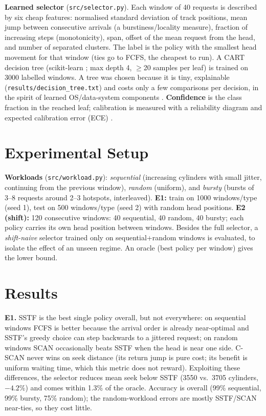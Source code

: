 \documentclass[10pt,a4paper]{article}
\begin{document}
\textbf{Learned selector} (\texttt{src/selector.py}). Each window of 40 requests is described by
six cheap features: normalised standard deviation of track positions, mean jump between
consecutive arrivals (a burstiness/locality measure), fraction of increasing steps
(monotonicity), span, offset of the mean request from the head, and number of separated
clusters. The label is the policy with the smallest head movement for that window (ties go to
FCFS, the cheapest to run). A CART decision tree \cite{breiman1984} (scikit-learn
\cite{sklearn}; max depth 4, $\geq$20 samples per leaf) is trained on 3000 labelled windows. A
tree was chosen because it is tiny, explainable (\texttt{results/decision\_tree.txt}) and costs
only a few comparisons per decision, in the spirit of learned OS/data-system components
\cite{kraska2018}. \textbf{Confidence} is the class fraction in the reached leaf; calibration is
measured with a reliability diagram and expected calibration error (ECE) \cite{guo2017}.

\section{Experimental Setup}
\textbf{Workloads} (\texttt{src/workload.py}): \emph{sequential} (increasing cylinders with small
jitter, continuing from the previous window), \emph{random} (uniform), and \emph{bursty}
(bursts of 3--8 requests around 2--3 hotspots, interleaved). \textbf{E1:} train on 1000
windows/type (seed 1), test on 500 windows/type (seed 2) with random head positions.
\textbf{E2 (shift):} 120 consecutive windows: 40 sequential, 40 random, 40 bursty; each policy
carries its own head position between windows. Besides the full selector, a
\emph{shift-naive} selector trained only on sequential+random windows is evaluated, to isolate
the effect of an unseen regime. An oracle (best policy per window) gives the lower bound.
\section{Results}
\begin{table}[H]\centering\small
\caption{E1: mean head movement per 40-request window on the test set (cylinders; lower is better).}
\end{table}
\vspace{-6pt}
\textbf{E1.} SSTF is the best single policy overall, but not everywhere: on sequential windows
FCFS is better because the arrival order is already near-optimal and SSTF's greedy choice can
step backwards to a jittered request; on random windows SCAN occasionally beats SSTF when the
head is near one side. C-SCAN never wins on seek distance (its return jump is pure cost; its
benefit is uniform waiting time, which this metric does not reward). Exploiting these
differences, the selector reduces mean seek below SSTF (3550 vs.\ 3705 cylinders, $-4.2\%$) and
comes within 1.3\% of the oracle. Accuracy is \TestAcc{} overall (99\% sequential, 99\% bursty,
75\% random); the random-workload errors are mostly SSTF/SCAN near-ties, so they cost little.
\end{document}
